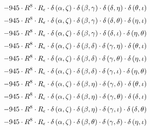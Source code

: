 \begin{subequations}
\begin{gather}
 \\[0.2em] \notag 		 - 945 \cdot R^{8} \cdot R_{\epsilon{}} \cdot \delta{}\left(\alpha{}, \zeta{}\right) \cdot \delta{}\left(\beta{}, \gamma{}\right) \cdot \delta{}\left(\delta{}, \eta{}\right) \cdot \delta{}\left(\theta{}, \iota{}\right) 
 \\[0.2em] \notag 		 - 945 \cdot R^{8} \cdot R_{\epsilon{}} \cdot \delta{}\left(\alpha{}, \zeta{}\right) \cdot \delta{}\left(\beta{}, \gamma{}\right) \cdot \delta{}\left(\delta{}, \theta{}\right) \cdot \delta{}\left(\eta{}, \iota{}\right) 
 \\[0.2em] \notag 		 - 945 \cdot R^{8} \cdot R_{\epsilon{}} \cdot \delta{}\left(\alpha{}, \zeta{}\right) \cdot \delta{}\left(\beta{}, \gamma{}\right) \cdot \delta{}\left(\delta{}, \iota{}\right) \cdot \delta{}\left(\eta{}, \theta{}\right) 
 \\[0.2em] \notag 		 - 945 \cdot R^{8} \cdot R_{\epsilon{}} \cdot \delta{}\left(\alpha{}, \zeta{}\right) \cdot \delta{}\left(\beta{}, \delta{}\right) \cdot \delta{}\left(\gamma{}, \eta{}\right) \cdot \delta{}\left(\theta{}, \iota{}\right) 
 \\[0.2em] \notag 		 - 945 \cdot R^{8} \cdot R_{\epsilon{}} \cdot \delta{}\left(\alpha{}, \zeta{}\right) \cdot \delta{}\left(\beta{}, \delta{}\right) \cdot \delta{}\left(\gamma{}, \theta{}\right) \cdot \delta{}\left(\eta{}, \iota{}\right) 
 \\[0.2em] \notag 		 - 945 \cdot R^{8} \cdot R_{\epsilon{}} \cdot \delta{}\left(\alpha{}, \zeta{}\right) \cdot \delta{}\left(\beta{}, \delta{}\right) \cdot \delta{}\left(\gamma{}, \iota{}\right) \cdot \delta{}\left(\eta{}, \theta{}\right) 
 \\[0.2em] \notag 		 - 945 \cdot R^{8} \cdot R_{\epsilon{}} \cdot \delta{}\left(\alpha{}, \zeta{}\right) \cdot \delta{}\left(\beta{}, \eta{}\right) \cdot \delta{}\left(\gamma{}, \delta{}\right) \cdot \delta{}\left(\theta{}, \iota{}\right) 
 \\[0.2em] \notag 		 - 945 \cdot R^{8} \cdot R_{\epsilon{}} \cdot \delta{}\left(\alpha{}, \zeta{}\right) \cdot \delta{}\left(\beta{}, \eta{}\right) \cdot \delta{}\left(\gamma{}, \theta{}\right) \cdot \delta{}\left(\delta{}, \iota{}\right) 
 \\[0.2em] \notag 		 - 945 \cdot R^{8} \cdot R_{\epsilon{}} \cdot \delta{}\left(\alpha{}, \zeta{}\right) \cdot \delta{}\left(\beta{}, \eta{}\right) \cdot \delta{}\left(\gamma{}, \iota{}\right) \cdot \delta{}\left(\delta{}, \theta{}\right) 
 \\[0.2em] \notag 		 - 945 \cdot R^{8} \cdot R_{\epsilon{}} \cdot \delta{}\left(\alpha{}, \zeta{}\right) \cdot \delta{}\left(\beta{}, \theta{}\right) \cdot \delta{}\left(\gamma{}, \delta{}\right) \cdot \delta{}\left(\eta{}, \iota{}\right) 

\end{gather}
\end{subequations}
